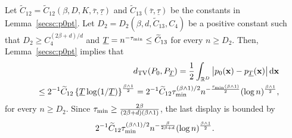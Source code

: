 \documentclass[twoside,11pt]{article}
\newcommand{\bx}{{\bf x}}
\newcommand{\bbR}{{\mathbb R}}
\newcommand{\be}{\begin{equation}}
\newcommand{\ee}{\end{equation}}
\newcommand{\bean}{\setlength\arraycolsep{1pt}\begin{eqnarray*}}
\newcommand{\eean}{\end{eqnarray*}}
\def\d{{\rm d}}
\begin{document}
Let $\widetilde C_{12} = \widetilde C_{12}(\beta, D, K, \overline{\tau}, \underline{\tau})$ and $\widetilde C_{13}(\overline{\tau}, \underline{\tau})$ be the constants in Lemma~\ref{secsc:p0pt}. 
Let $ D_{2} = D_{2} ( \beta, d, \widetilde C_{13}, C_{4} )  $ be a positive constant such that $ D_{2} \geq C_{4}^{(2\beta + d) / d} $ and $ \underline{T} = n^{-\tau_{\rm min}} \leq \widetilde C_{13} $ for every $n \geq D_{2}$.
Then, Lemma~\ref{secsc:p0pt} implies that
\bean
&& d_{\rm TV}(P_{0}, P_{\underline{T}}) = \frac{1}{2} \int_{\bbR^{D}} \left\vert p_0(\bx) - p_{\underline{T}}(\bx) \right\vert \d \bx
\\
&& \leq 2^{-1} \widetilde  C_{12} \left\{ \underline{T} \log (1/ \underline{T}) \right\}^{\frac{ \beta \wedge 1 }{2}} 
= 2^{-1} \widetilde C_{12} \tau_{\rm min}^{(\beta \wedge 1)/2}   n^{- \frac{ \tau_{\rm min} (\beta \wedge 1) }{2}} ( \log n)^{\frac{\beta \wedge 1}{2}},
\eean
for every $n \geq D_{2}$.
Since $\tau_{\rm min} \geq \frac{2\beta}{(2\beta + d)(\beta \wedge 1)}$, the last display is bounded by
\be
2^{-1} \widetilde C_{12} \tau_{\rm min}^{(\beta \wedge 1)/2}   n^{-\frac{\beta }{2\beta + d}} (\log n)^{\frac{\beta \wedge 1}{2}}. \label{eqthm2:firbd}
\ee

\end{document}
